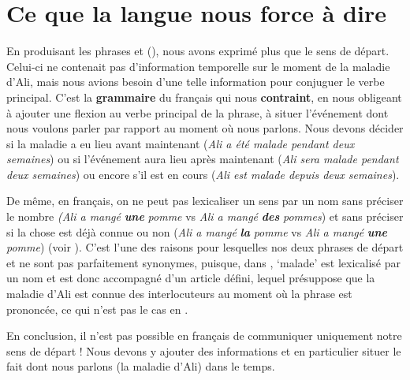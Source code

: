 \section{Ce que la langue nous force à dire}\label{sec:1.2.11}

En produisant les phrases  et  (), nous avons exprimé plus que le sens de départ. Celui-ci ne contenait pas d’information temporelle sur le moment de la maladie d’Ali, mais nous avions besoin d’une telle information pour conjuguer le verbe principal. C’est la \textbf{grammaire} du français qui nous \textbf{contraint}, en nous obligeant à ajouter une flexion au verbe principal de la phrase, à situer l’événement dont nous voulons parler par rapport au moment où nous parlons. Nous devons décider si la maladie a eu lieu avant maintenant (\textit{Ali a été malade pendant deux semaines}) ou si l’événement aura lieu après maintenant (\textit{Ali sera malade pendant deux semaines}) ou encore s’il est en cours (\textit{Ali est malade depuis deux semaines}).

De même, en français, on ne peut pas lexicaliser un sens par un nom sans préciser le nombre \textit{(Ali a mangé} \textbf{\textit{une}} \textit{pomme} vs \textit{Ali a mangé} \textbf{\textit{des}} \textit{pommes}) et sans préciser si la chose est déjà connue ou non (\textit{Ali a mangé} \textbf{\textit{la}} \textit{pomme} vs \textit{Ali a mangé} \textbf{\textit{une}} \textit{pomme}) (voir ). C’est l’une des raisons pour lesquelles nos deux phrases de départ  et  ne sont pas parfaitement synonymes, puisque, dans , ‘malade’ est lexicalisé par un nom et est donc accompagné d’un article défini, lequel présuppose que la maladie d’Ali est connue des interlocuteurs au moment où la phrase est prononcée, ce qui n’est pas le cas en .

En conclusion, il n’est pas possible en français de communiquer uniquement notre sens de départ ! Nous devons y ajouter des informations et en particulier situer le fait dont nous parlons (la maladie d’Ali) dans le temps.

